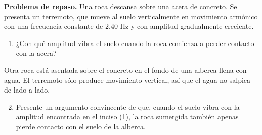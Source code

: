 \item \textbf{Problema de repaso.}
Una roca descansa sobre una acera de concreto. Se presenta un terremoto, que mueve al suelo verticalmente en movimiento armónico con una frecuencia constante de $2.40\text{ Hz}$ y con amplitud gradualmente creciente.
\begin{enumerate}
    \item ¿Con qué amplitud vibra el suelo cuando la roca comienza a perder contacto con la acera?
\end{enumerate}
Otra roca está asentada sobre el concreto en el fondo de una alberca llena con agua. El terremoto sólo produce movimiento vertical, así que el agua no salpica de lado a lado.
\begin{enumerate}
    \setcounter{enumi}{1}
    \item Presente un argumento convincente de que, cuando el suelo vibra con la amplitud encontrada en el inciso (1), la roca sumergida también apenas pierde contacto con el suelo de la alberca.
\end{enumerate}